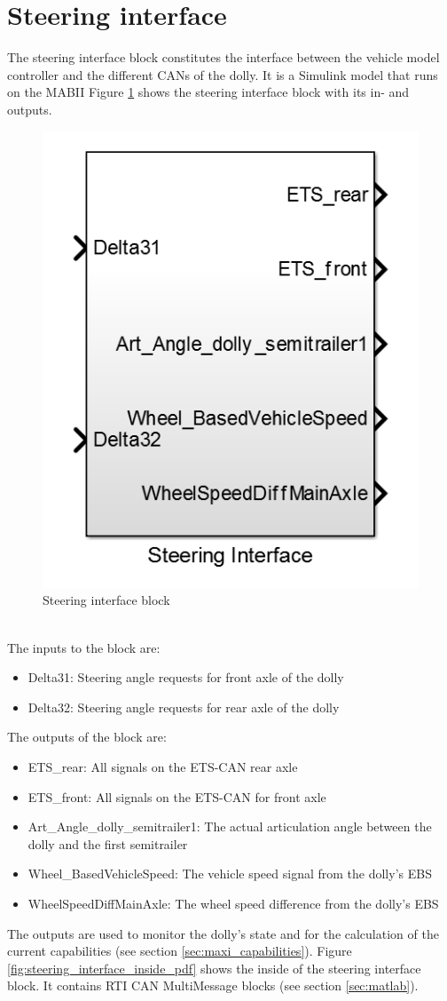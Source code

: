 \documentclass[ExampleMasters.tex]{subfiles}
\begin{document}
	
\section{Steering interface}
\label{sec:steering_interface}
The steering interface block constitutes the interface between the vehicle model controller and the different \gls{CAN}s of the dolly. It is a Simulink model that runs on the \gls{MABII}
Figure \ref{fig:steering_interface} shows the steering interface block with its in- and outputs. 
\begin{figure}[!htb]
	\centering
	\includegraphics[width=0.5\linewidth]{figures/steering_interface}
	
	\caption{Steering interface block}
	\label{fig:steering_interface}
\end{figure} \\
The inputs to the block are:
\begin{itemize}
	\item Delta31: Steering angle requests for front axle of the dolly 
	\item Delta32: Steering angle requests for rear axle of the dolly 
\end{itemize} 
 The outputs of the block are:
 \begin{itemize}
 	\item ETS\_rear: All signals on the \gls{ETS}-\gls{CAN} rear axle
 	\item ETS\_front: All signals on the \gls{ETS}-\gls{CAN} for front axle
 	\item Art\_Angle\_dolly\_semitrailer1: The actual articulation angle between the dolly and the first semitrailer
 	\item Wheel\_BasedVehicleSpeed: The vehicle speed signal from the dolly's \gls{EBS}
 	\item WheelSpeedDiffMainAxle: The wheel speed difference from the dolly's \gls{EBS}
 \end{itemize}
 The outputs are used to monitor the dolly's state and for the calculation of the current capabilities (see section \ref{sec:maxi_capabilities}).
 Figure \ref{fig:steering_interface_inside_pdf} shows the inside of the steering interface block. It contains \gls{RTI} \gls{CAN} MultiMessage blocks (see section \ref{sec:matlab}).   
 
\end{document}
